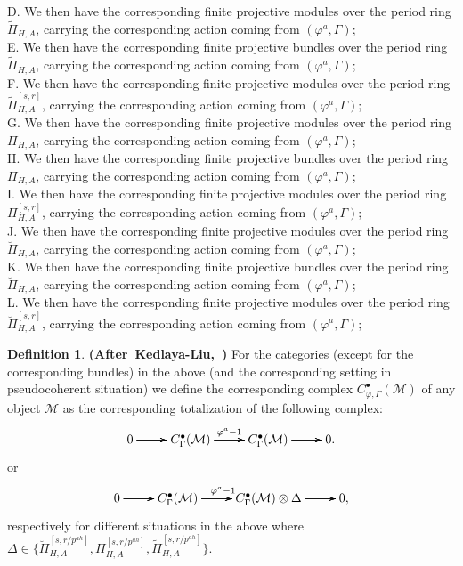 \documentclass[12pt]{amsart}
\theoremstyle{definition}
\newtheorem{definition}[theorem]{Definition}
\numberwithin{equation}{section}
\begin{document}
\noindent D. We then have the corresponding finite projective modules over the period ring ${\widetilde{\Pi}}_{H,A}$, carrying the corresponding action coming from $(\varphi^a,\Gamma)$;\\
\noindent E. We then have the corresponding finite projective bundles over the period ring ${\widetilde{\Pi}}_{H,A}$, carrying the corresponding action coming from $(\varphi^a,\Gamma)$;\\
\noindent F. We then have the corresponding finite projective modules over the period ring ${\widetilde{\Pi}}^{[s,r]}_{H,A}$, carrying the corresponding action coming from $(\varphi^a,\Gamma)$;\\
\noindent G. We then have the corresponding finite projective modules over the period ring ${{\Pi}}_{H,A}$, carrying the corresponding action coming from $(\varphi^a,\Gamma)$;\\
\noindent H. We then have the corresponding finite projective bundles over the period ring ${{\Pi}}_{H,A}$, carrying the corresponding action coming from $(\varphi^a,\Gamma)$;\\
\noindent I. We then have the corresponding finite projective modules over the period ring ${{\Pi}}^{[s,r]}_{H,A}$, carrying the corresponding action coming from $(\varphi^a,\Gamma)$;\\
\noindent J. We then have the corresponding finite projective modules over the period ring ${\breve{\Pi}}_{H,A}$, carrying the corresponding action coming from $(\varphi^a,\Gamma)$;\\
\noindent K. We then have the corresponding finite projective bundles over the period ring ${\breve{\Pi}}_{H,A}$, carrying the corresponding action coming from $(\varphi^a,\Gamma)$;\\
\noindent L. We then have the corresponding finite projective modules over the period ring ${\breve{\Pi}}^{[s,r]}_{H,A}$, carrying the corresponding action coming from $(\varphi^a,\Gamma)$;\\



\begin{definition} \mbox{\bf{(After Kedlaya-Liu, \cite[Definition 5.7.9]{KL16})}} For the categories (except for the corresponding bundles) in the above (and the corresponding setting in pseudocoherent situation) we define the corresponding complex $C^\bullet_{\varphi,\Gamma}(\mathcal{M})$ of any object $\mathcal{M}$ as the corresponding totalization of the following complex:
\[
\xymatrix@R+0pc@C+0pc{
0\ar[r] \ar[r] \ar[r] &C^\bullet_{\Gamma}(\mathcal{M})\ar[r]^{\varphi^a-1} \ar[r] \ar[r]  &C^\bullet_{\Gamma}(\mathcal{M}) \ar[r] \ar[r] \ar[r]&0.
}
\]	
or 
\[
\xymatrix@R+0pc@C+0pc{
0\ar[r] \ar[r] \ar[r] &C^\bullet_{\Gamma}(\mathcal{M})\ar[r]^{\varphi^a-1} \ar[r] \ar[r]  &C^\bullet_{\Gamma}(\mathcal{M})\otimes \Delta \ar[r] \ar[r] \ar[r]&0,
}
\]
respectively for different situations in the above where $\Delta\in \{{\breve{\Pi}}^{[s,r/p^{ah}]}_{H,A},{{\Pi}}^{[s,r/p^{ah}]}_{H,A},{\widetilde{\Pi}}^{[s,r/p^{ah}]}_{H,A}\}$.
\end{definition}
\end{document}
